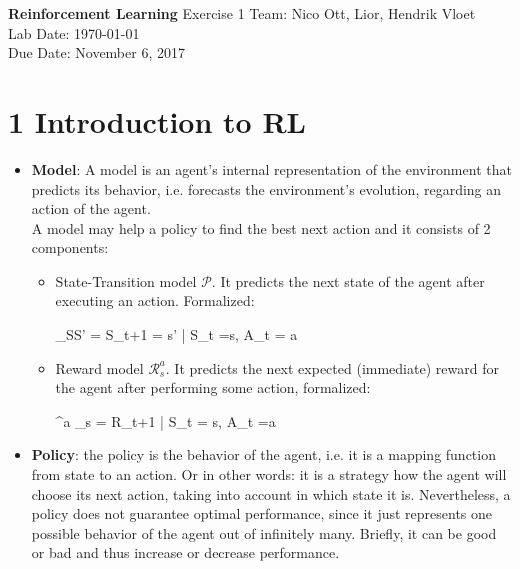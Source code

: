 \documentclass[a4paper, 11pt]{article}
\begin{document}
\noindent
\large\textbf{Reinforcement Learning} \hfill %
\normalsize Exercise 1 \hfill Team: Nico Ott, Lior, Hendrik Vloet \\
\hfill Lab Date: \today \\
\hfill Due Date: November 6, 2017
\section*{1 Introduction to RL}
\begin{itemize}
	\item \textbf{Model}: A model is an agent's internal representation of the environment that predicts its behavior, i.e. forecasts the environment's evolution, regarding an action of the agent.\\
	 A model may help a policy to find the best next action and it consists of 2 components:
	\begin{itemize}
		\item State-Transition model $\mathcal{P}$. It predicts the next state of the agent after executing an action. Formalized:
		\begin{flalign*}
			 _{SS'} =   \left\lbrace S_{t+1}   = s' | S_t =s, A_t = a    \right\rbrace \\
		\end{flalign*}
		\item Reward model $\mathcal{R}^a _s$. It predicts the next expected (immediate) reward for the agent after performing some action, formalized:
		\begin{flalign*}
			^a _s =  \lbrace R_{t+1} | S_t = s, A_t =a \rbrace \\
		\end{flalign*}
	\end{itemize}
    \item \textbf{Policy}: the policy is the behavior of the agent, i.e. it is a mapping function from state to an action. Or in other words: it is a strategy how the agent will choose its next action, taking into account in which state it is. Nevertheless, a policy does not guarantee optimal performance, since it just represents one possible behavior of the agent out of infinitely many. Briefly, it can be good or bad and thus increase or decrease performance.\\

\end{itemize}
\end{document}
